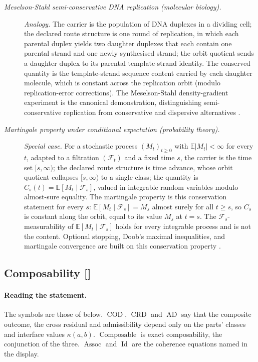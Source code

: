 \begin{description}
\item[\emph{Meselson-Stahl semi-conservative {DNA}
replication (molecular biology).}] \textit{Analogy.}
The carrier is the population of DNA duplexes in a
dividing cell; the declared route structure is one
round of replication, in which each parental duplex
yields two daughter duplexes that each contain one
parental strand and one newly synthesised strand; the
orbit quotient sends a daughter duplex to its parental
template-strand identity.  The conserved quantity is
the template-strand sequence content carried by each
daughter molecule, which is constant across the
replication orbit (modulo replication-error
corrections).  The Meselson-Stahl density-gradient
experiment is the canonical demonstration,
distinguishing semi-conservative replication from
conservative and dispersive alternatives
\citep{MeselsonStahl1958Replication}.

\item[\emph{Martingale property under conditional
expectation (probability theory).}] \textit{Special case.}
For a stochastic process \((M_t)_{t\ge 0}\) with \(\mathbb E|M_t|<\infty\) for every \(t\), adapted to a filtration
\((\mathcal F_t)\) and a fixed time \(s\), the carrier is the time set
\([s,\infty)\); the declared route structure is time advance, whose
orbit quotient collapses \([s,\infty)\) to a single class; the
quantity is \(C_s(t)=\mathbb E[M_t\mid\mathcal F_s]\), valued in
integrable random variables modulo almost-sure equality.  The
martingale property is this conservation statement for every \(s\):
\(\mathbb E[M_t\mid\mathcal F_s]=M_s\) almost surely for all
\(t\ge s\), so \(C_s\) is constant along
the orbit, equal to its value \(M_s\) at \(t=s\).  The
\(\mathcal F_s\)-measurability of \(\mathbb E[M_t\mid\mathcal F_s]\)
holds for every integrable process and is not the content.  Optional
stopping, Doob's maximal inequalities, and martingale convergence
are built on this conservation property
\citep{Doob1953Stochastic}.
\end{description}
\endgroup

\subsection{Composability [\texorpdfstring{}{F28}]}\label{sec:status-records-coherence:composability}

\paragraph{Reading the statement.} The symbols are those of  below.
\(\operatorname{COD}\), \(\operatorname{CRD}\) and
\(\operatorname{AD}\) say that the composite outcome, the cross residual
and admissibility depend only on the parts' classes and interface
values \(\kappa(a,b)\). \(\operatorname{Composable}\) is exact
composability, the conjunction of the three. \(\operatorname{Assoc}\)
and \(\operatorname{Id}\) are the coherence equations named in the
display.

